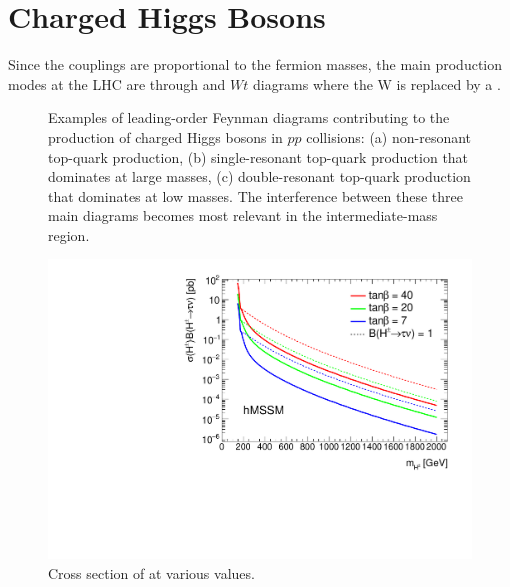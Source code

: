 \section{Charged Higgs Bosons}\label{sec:Hpm}
	Since the \Hpm couplings are proportional to the fermion masses, the main production modes at the LHC are through \ttbar and $Wt$ diagrams where the W is replaced by a \Hpm.
	\begin{figure}[!h]
		\centering
		\caption{\label{fig:hpm-diagrams} Examples of leading-order Feynman diagrams contributing to the production of 
		charged Higgs bosons in $pp$ collisions: (a) non-resonant top-quark production, (b) single-resonant 
		top-quark production that dominates at large \Hpm masses, (c) double-resonant top-quark production that 
		dominates at low \Hpm masses. The interference between these three main diagrams becomes 
		most relevant in the intermediate-mass region.}
	\end{figure}
	\begin{figure}[!h]
		\centering
		\includegraphics[width=0.75\linewidth]{chapters/chapter1_theory/images/XSBR_hmssm.pdf}
		\caption{\label{fig:hpm-xsec} Cross section of \Hpm at various \tanb values.}
	\end{figure}
